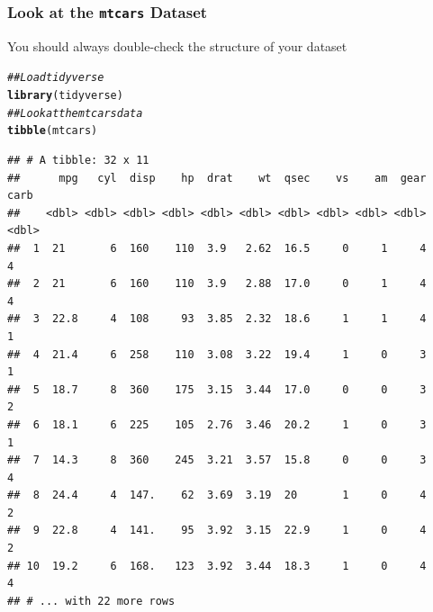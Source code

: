 \documentclass{beamer}\usepackage[]{graphicx}\usepackage[]{xcolor}
\makeatletter
\newcommand{\hlcom}[1]{\textcolor[rgb]{0.678,0.584,0.686}{\textit{#1}}}%
\newcommand{\hlstd}[1]{\textcolor[rgb]{0.345,0.345,0.345}{#1}}%
\newcommand{\hlkwd}[1]{\textcolor[rgb]{0.737,0.353,0.396}{\textbf{#1}}}%
\newenvironment{kframe}{%
 \def\at@end@of@kframe{}%
 \ifinner\ifhmode%
  \def\at@end@of@kframe{\end{minipage}}%
  \begin{minipage}{\columnwidth}%
 \fi\fi%
 \def\FrameCommand##1{\hskip\@totalleftmargin \hskip-\fboxsep
 \colorbox{shadecolor}{##1}\hskip-\fboxsep
     \hskip-\linewidth \hskip-\@totalleftmargin \hskip\columnwidth}%
 \MakeFramed {\advance\hsize-\width
   \@totalleftmargin\z@ \linewidth\hsize
   \@setminipage}}%
 {\par\unskip\endMakeFramed%
 \at@end@of@kframe}
\newenvironment{knitrout}{}{} %
\makeatother
\begin{document}
\begin{frame}[fragile]\frametitle{Look at the \texttt{mtcars} Dataset}
    You should always double-check the structure of your dataset
\begin{knitrout}\footnotesize
{}\color{fgcolor}\begin{kframe}
\begin{alltt}
\hlcom{## Load tidyverse}
\hlkwd{library}\hlstd{(tidyverse)}
\hlcom{## Look at the mtcars data}
\hlkwd{tibble}\hlstd{(mtcars)}
\end{alltt}
\begin{verbatim}
## # A tibble: 32 x 11
##      mpg   cyl  disp    hp  drat    wt  qsec    vs    am  gear  carb
##    <dbl> <dbl> <dbl> <dbl> <dbl> <dbl> <dbl> <dbl> <dbl> <dbl> <dbl>
##  1  21       6  160    110  3.9   2.62  16.5     0     1     4     4
##  2  21       6  160    110  3.9   2.88  17.0     0     1     4     4
##  3  22.8     4  108     93  3.85  2.32  18.6     1     1     4     1
##  4  21.4     6  258    110  3.08  3.22  19.4     1     0     3     1
##  5  18.7     8  360    175  3.15  3.44  17.0     0     0     3     2
##  6  18.1     6  225    105  2.76  3.46  20.2     1     0     3     1
##  7  14.3     8  360    245  3.21  3.57  15.8     0     0     3     4
##  8  24.4     4  147.    62  3.69  3.19  20       1     0     4     2
##  9  22.8     4  141.    95  3.92  3.15  22.9     1     0     4     2
## 10  19.2     6  168.   123  3.92  3.44  18.3     1     0     4     4
## # ... with 22 more rows
\end{verbatim}
\end{kframe}
\end{knitrout}
\end{frame}
\end{document}
